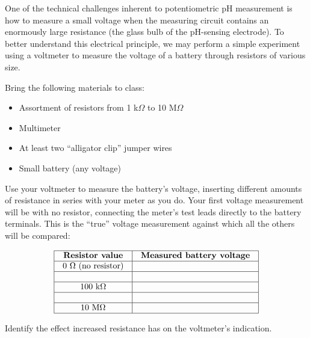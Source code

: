 
One of the technical challenges inherent to potentiometric pH measurement is how to measure a small voltage when the measuring circuit contains an enormously large resistance (the glass bulb of the pH-sensing electrode).  To better understand this electrical principle, we may perform a simple experiment using a voltmeter to measure the voltage of a battery through resistors of various size.

\vskip 10pt

Bring the following materials to class:

\begin{itemize}
\item{} Assortment of resistors from 1 k$\Omega$ to 10 M$\Omega$
\vskip 5pt
\item{} Multimeter 
\vskip 5pt
\item{} At least two ``alligator clip'' jumper wires
\vskip 5pt
\item{} Small battery (any voltage)
\end{itemize}

Use your voltmeter to measure the battery's voltage, inserting different amounts of resistance in series with your meter as you do.  Your first voltage measurement will be with no resistor, connecting the meter's test leads directly to the battery terminals.  This is the ``true'' voltage measurement against which all the others will be compared:


$$\vbox{\offinterlineskip
\halign{\strut
\vrule \quad\hfil # \ \hfil & 
\vrule \quad\hfil # \ \hfil \vrule \cr
\noalign{\hrule}
%
{\bf Resistor value} & {\bf Measured battery voltage} \cr
%
\noalign{\hrule}
%
0 $\Omega$ (no resistor)  &  \cr
%
\noalign{\hrule}
%
 &  \cr
%
\noalign{\hrule}
%
100 k$\Omega$ &  \cr
%
\noalign{\hrule}
%
 &  \cr
%
\noalign{\hrule}
%
10 M$\Omega$ &  \cr
%
\noalign{\hrule}
} %
}$$ %

\vskip 10pt

Identify the effect increased resistance has on the voltmeter's indication.


